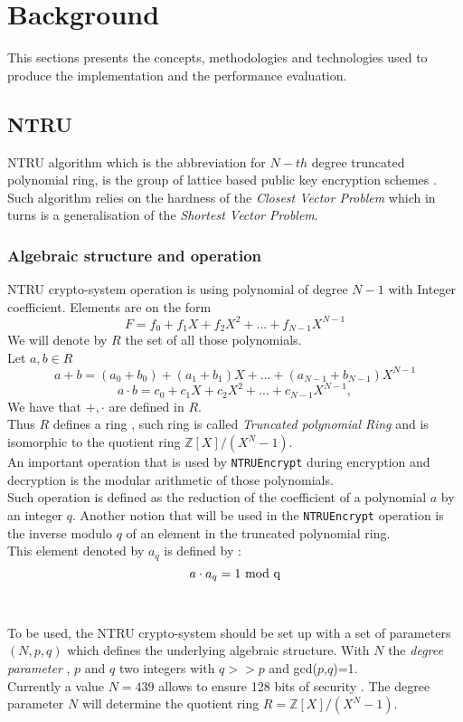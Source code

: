 \section{Background}
\label{sec:background}

This sections presents the concepts, methodologies and technologies used to produce the implementation and the performance evaluation.

\subsection{NTRU}
NTRU algorithm which is the abbreviation for $N-th$ degree truncated polynomial ring, is the group of lattice based public key encryption schemes \cite{hoffstein_ntru:_2006} . \\
Such algorithm relies on the hardness of the \textit{Closest Vector Problem}\cite{micciancio_closest_2003} which in turns is a generalisation of the \textit{Shortest Vector Problem}.
\subsubsection{Algebraic structure and operation}
NTRU crypto-system operation is using polynomial of degree $N-1$ with Integer coefficient. Elements are on the form $$F = f_0+f_1X+f_2X^2+... +f_{N-1}X^{N-1} $$  We will denote by $R$ the set of all those polynomials.\\
Let $a,b \in R$  
$$a+b = (a_0+b_0) + (a_1+b_1)X+...+(a_{N-1}+b_{N-1})X^{N-1}$$
$$ a\cdot b = c_0+c_1X+c_2X^2+...+c_{N-1}X^{N-1}, $$
We have that $+,\cdot $ are defined in $R$. \\Thus $R$ defines a ring , such ring is called \textit{Truncated polynomial Ring} and is isomorphic to the quotient ring $\mathbb{Z}{[X]/(X^N-1)}$.\\
An important operation that is used by \texttt{NTRUEncrypt} during encryption and decryption is the modular arithmetic of those polynomials.\\
Such operation is defined as the reduction of the coefficient of a polynomial $a$ by an integer $q$.
Another notion that will be used in the \texttt{NTRUEncrypt} operation is the inverse modulo $q$ of an element in the truncated polynomial ring.\\ This element denoted by $a_q$ is defined by : $$ a\cdot a_q = 1 \textnormal{ mod q} $$
\\ \\
To be used, the NTRU crypto-system should be set up with a set of parameters $(N,p,q)$ which defines the underlying algebraic structure. With $N$ the \textit{degree parameter} , $p$ and $q$ two integers with $q >> p$ and gcd($p$,$q$)=1.\\ Currently a value $N=439$ allows to ensure 128 bits of security \cite{noauthor_open_2018}. The degree parameter $N$ will determine the quotient ring $R=\mathbb{Z}{[X]/(X^N-1)}$.

